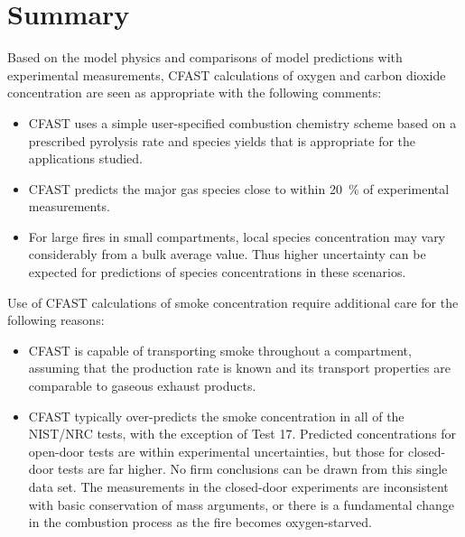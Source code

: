 \section{Summary}

Based on the model physics and comparisons of model predictions with experimental measurements, CFAST calculations of oxygen and carbon dioxide concentration are seen as appropriate with the following comments:

\begin{itemize}
\item CFAST uses a simple user-specified combustion chemistry scheme based on a prescribed pyrolysis rate and species yields that is appropriate for the applications studied.
\item CFAST predicts the major gas species close to within 20~\% of experimental measurements.
\item For large fires in small compartments, local species concentration may vary considerably from a bulk average value.  Thus higher uncertainty can be expected for predictions of species concentrations in these scenarios.
\end{itemize}

Use of CFAST calculations of smoke concentration require additional care for the following reasons:

\begin{itemize}
\item CFAST is capable of transporting smoke throughout a compartment, assuming that the production rate is known and its transport properties are comparable to gaseous exhaust products.
\item CFAST typically over-predicts the smoke concentration in all of the NIST/NRC tests, with the exception of Test 17.  Predicted concentrations for open-door tests are within experimental uncertainties, but those for closed-door tests are far higher.  No firm conclusions can be drawn from this single data set.  The measurements in the closed-door experiments are inconsistent with basic conservation of mass arguments, or there is a fundamental change in the combustion process as the fire becomes oxygen-starved.
\end{itemize}